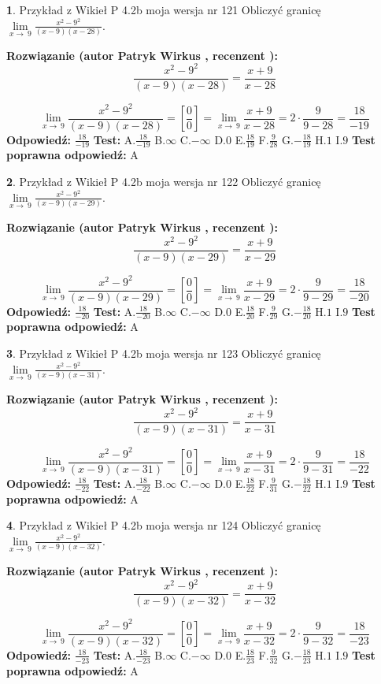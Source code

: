 \documentclass[12pt, a4paper]{article}
\theoremstyle{definition} %
\newtheorem{zad}{}
\newcommand{\zadStart}[1]{\begin{zad}#1\newline}
\newcommand{\zadStop}{\end{zad}}
\newcommand{\rozwStart}[2]{\noindent \textbf{Rozwiązanie (autor #1 , recenzent #2): }\newline}
\newcommand{\rozwStop}{\newline}
\newcommand{\odpStart}{\noindent \textbf{Odpowiedź:}\newline}
\newcommand{\odpStop}{\newline}
\newcommand{\testStart}{\noindent \textbf{Test:}\newline}
\newcommand{\testStop}{\newline}
\newcommand{\kluczStart}{\noindent \textbf{Test poprawna odpowiedź:}\newline}
\newcommand{\kluczStop}{\newline}
\begin{document}
\zadStart{Przykład z Wikieł P 4.2b moja wersja nr 121}
Obliczyć granicę $\lim\limits_{x\to\ 9}\frac{x^{2}-9^{2}}{(x-9)(x-28)}$.
\zadStop
\rozwStart{Patryk Wirkus}{}
$$\frac{x^{2}-9^{2}}{(x-9)(x-28)}=\frac{x+9}{x-28}$$

$$\lim\limits_{x\to\ 9}\frac{x^{2}-9^{2}}{(x-9)(x-28)}=[\frac{0}{0}]=\lim\limits_{x\to\ 9}\frac{x+9}{x-28}=2 \cdot \frac{9}{9-28} = \frac{18}{-19}$$
\rozwStop
\odpStart
$\frac{18}{-19}$
\odpStop
\testStart
A.$\frac{18}{-19}$
B.$\infty$
C.$-\infty$
D.$0$
E.$\frac{18}{19}$
F.$\frac{9}{28}$
G.$-\frac{18}{19}$
H.$1$
I.$9$
\testStop
\kluczStart
A
\kluczStop



\zadStart{Przykład z Wikieł P 4.2b moja wersja nr 122}
Obliczyć granicę $\lim\limits_{x\to\ 9}\frac{x^{2}-9^{2}}{(x-9)(x-29)}$.
\zadStop
\rozwStart{Patryk Wirkus}{}
$$\frac{x^{2}-9^{2}}{(x-9)(x-29)}=\frac{x+9}{x-29}$$

$$\lim\limits_{x\to\ 9}\frac{x^{2}-9^{2}}{(x-9)(x-29)}=[\frac{0}{0}]=\lim\limits_{x\to\ 9}\frac{x+9}{x-29}=2 \cdot \frac{9}{9-29} = \frac{18}{-20}$$
\rozwStop
\odpStart
$\frac{18}{-20}$
\odpStop
\testStart
A.$\frac{18}{-20}$
B.$\infty$
C.$-\infty$
D.$0$
E.$\frac{18}{20}$
F.$\frac{9}{29}$
G.$-\frac{18}{20}$
H.$1$
I.$9$
\testStop
\kluczStart
A
\kluczStop



\zadStart{Przykład z Wikieł P 4.2b moja wersja nr 123}
Obliczyć granicę $\lim\limits_{x\to\ 9}\frac{x^{2}-9^{2}}{(x-9)(x-31)}$.
\zadStop
\rozwStart{Patryk Wirkus}{}
$$\frac{x^{2}-9^{2}}{(x-9)(x-31)}=\frac{x+9}{x-31}$$

$$\lim\limits_{x\to\ 9}\frac{x^{2}-9^{2}}{(x-9)(x-31)}=[\frac{0}{0}]=\lim\limits_{x\to\ 9}\frac{x+9}{x-31}=2 \cdot \frac{9}{9-31} = \frac{18}{-22}$$
\rozwStop
\odpStart
$\frac{18}{-22}$
\odpStop
\testStart
A.$\frac{18}{-22}$
B.$\infty$
C.$-\infty$
D.$0$
E.$\frac{18}{22}$
F.$\frac{9}{31}$
G.$-\frac{18}{22}$
H.$1$
I.$9$
\testStop
\kluczStart
A
\kluczStop



\zadStart{Przykład z Wikieł P 4.2b moja wersja nr 124}
Obliczyć granicę $\lim\limits_{x\to\ 9}\frac{x^{2}-9^{2}}{(x-9)(x-32)}$.
\zadStop
\rozwStart{Patryk Wirkus}{}
$$\frac{x^{2}-9^{2}}{(x-9)(x-32)}=\frac{x+9}{x-32}$$

$$\lim\limits_{x\to\ 9}\frac{x^{2}-9^{2}}{(x-9)(x-32)}=[\frac{0}{0}]=\lim\limits_{x\to\ 9}\frac{x+9}{x-32}=2 \cdot \frac{9}{9-32} = \frac{18}{-23}$$
\rozwStop
\odpStart
$\frac{18}{-23}$
\odpStop
\testStart
A.$\frac{18}{-23}$
B.$\infty$
C.$-\infty$
D.$0$
E.$\frac{18}{23}$
F.$\frac{9}{32}$
G.$-\frac{18}{23}$
H.$1$
I.$9$
\testStop
\kluczStart
A
\kluczStop
\end{document}
